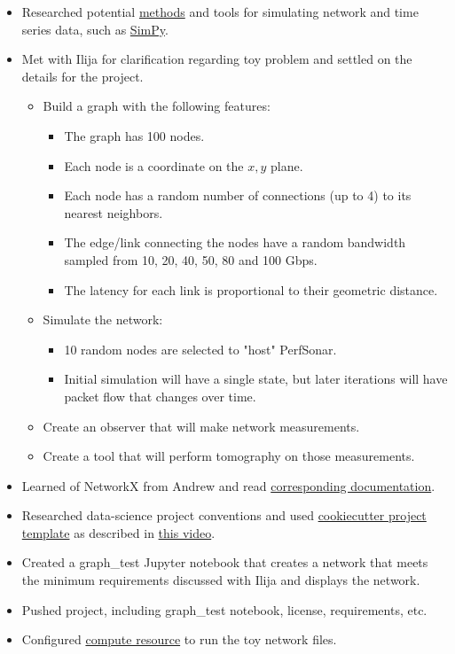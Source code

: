 \documentclass{weeklyreport}
\begin{document}
\begin{itemize}
    \item Researched potential \href{https://www.grotto-networking.com/DiscreteEventPython.html}{methods} and tools for simulating network and time series data, such as \href{https://simpy.readthedocs.io/en/latest/}{SimPy}.
    \item Met with Ilija for clarification regarding toy problem and settled on the details for the project.
        \begin{itemize}
            \item Build a graph with the following features:
                \begin{itemize}
                    \item The graph has 100 nodes.
                    \item Each node is a coordinate on the $x,y$ plane.
                    \item Each node has a random number of connections (up to 4) to its nearest neighbors.
                    \item The edge/link connecting the nodes have a random bandwidth sampled from 10, 20, 40, 50, 80 and 100 Gbps.
                    \item The latency for each link is proportional to their geometric distance.
                \end{itemize}
            \item Simulate the network:
                \begin{itemize}
                    \item 10 random nodes are selected to "host" PerfSonar.
                    \item Initial simulation will have a single state, but later iterations will have packet flow that changes over time.
                \end{itemize}
            \item Create an observer that will make network measurements.
            \item Create a tool that will perform tomography on those measurements.
        \end{itemize}
    \item Learned of NetworkX from Andrew and read \href{https://networkx.github.io/documentation/stable/}{corresponding documentation}.
    \item Researched data-science project conventions and used \href{https://github.com/drivendata/cookiecutter-data-science}{cookiecutter project template} as described in \href{https://www.youtube.com/watch?v=HM56wCNxCnQ}{this video}.
    \item Created a graph\_test Jupyter notebook that creates a network that meets the minimum requirements discussed with Ilija and displays the network.
    \item Pushed project, including graph\_test notebook, license, requirements, etc.
    \item Configured \href{https://edrisq.codas.slateci.net/}{compute resource} to run the toy network files. 
\end{itemize}
\end{document}
